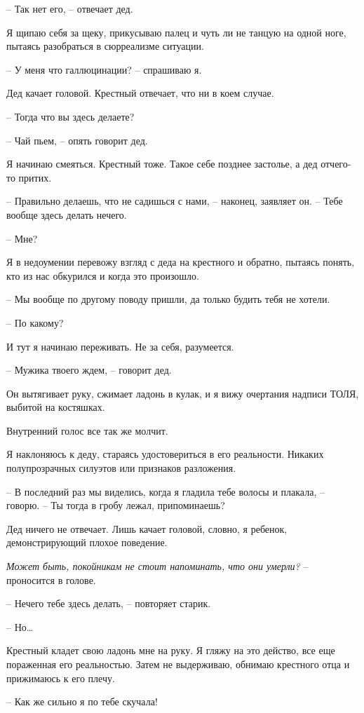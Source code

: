 \documentclass[
]{book}
\begin{document}
-- Так нет его, -- отвечает дед.

Я щипаю себя за щеку, прикусываю палец и чуть ли не танцую на одной ноге, пытаясь разобраться в сюрреализме ситуации.

-- У меня что галлюцинации? -- спрашиваю я.

Дед качает головой. Крестный отвечает, что ни в коем случае.

-- Тогда что вы здесь делаете?

-- Чай пьем, -- опять говорит дед.

Я начинаю смеяться. Крестный тоже. Такое себе позднее застолье, а дед отчего-то притих.

-- Правильно делаешь, что не садишься с нами, -- наконец, заявляет он. -- Тебе вообще здесь делать нечего.

-- Мне?

Я в недоумении перевожу взгляд с деда на крестного и обратно, пытаясь понять, кто из нас обкурился и когда это произошло.

-- Мы вообще по другому поводу пришли, да только будить тебя не хотели.

-- По какому?

И тут я начинаю переживать. Не за себя, разумеется.

-- Мужика твоего ждем, -- говорит дед.

Он вытягивает руку, сжимает ладонь в кулак, и я вижу очертания надписи ТОЛЯ, выбитой на костяшках.

Внутренний голос все так же молчит.

Я наклоняюсь к деду, стараясь удостовериться в его реальности. Никаких полупрозрачных силуэтов или признаков разложения.

-- В последний раз мы виделись, когда я гладила тебе волосы и плакала, -- говорю. -- Ты тогда в гробу лежал, припоминаешь?

Дед ничего не отвечает. Лишь качает головой, словно, я ребенок, демонстрирующий плохое поведение.

\emph{Может быть, покойникам не стоит напоминать, что они умерли?} -- проносится в голове.

-- Нечего тебе здесь делать, -- повторяет старик.

-- Но\ldots{}

Крестный кладет свою ладонь мне на руку. Я гляжу на это действо, все еще пораженная его реальностью. Затем не выдерживаю, обнимаю крестного отца и прижимаюсь к его плечу.

-- Как же сильно я по тебе скучала!
\end{document}
